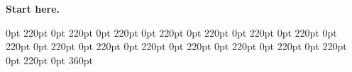 \documentclass[a4paper,11pt]{article}
\begin{document}
\vspace*{3cm}
\noindent\textbf{Start here.}\par
{} 0pt 220pt 0pt 220pt 0pt 220pt 0pt 220pt 0pt 220pt 0pt 220pt 0pt 220pt 0pt 220pt 0pt 220pt 0pt 220pt 0pt 220pt 0pt 220pt 0pt 220pt 0pt 220pt 0pt 220pt 0pt 220pt 0pt 360pt
\lipsum[1]%
\end{document}
